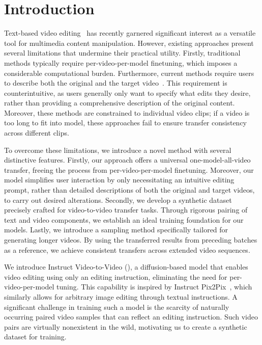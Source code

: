 \section{Introduction}
\label{sec:intro}




Text-based video editing~\cite{tuneavideo,zhao2023controlvideo,vid2vid,qi2023fatezero,liu2023video} has recently garnered significant interest as a versatile tool for multimedia content manipulation. However, existing approaches present several limitations that undermine their practical utility. Firstly, traditional methods typically require per-video-per-model finetuning, which imposes a considerable computational burden. Furthermore, current methods require users to describe both the original and the target video~\cite{tuneavideo,zhao2023controlvideo,vid2vid,qi2023fatezero,liu2023video}. This requirement is counterintuitive, as users generally only want to specify what edits they desire, rather than providing a comprehensive description of the original content. Moreover, these methods are constrained to individual video clips; if a video is too long to fit into model, these approaches fail to ensure transfer consistency across different clips.

To overcome these limitations, we introduce a novel method with several distinctive features. 
Firstly, our approach offers a universal one-model-all-video transfer, freeing the process from per-video-per-model finetuning. Moreover, our model simplifies user interaction by only necessitating an intuitive editing prompt, rather than detailed descriptions of both the original and target videos, to carry out desired alterations. Secondly, we develop a synthetic dataset precisely crafted for video-to-video transfer tasks. Through rigorous pairing of text and video components, we establish an ideal training foundation for our models. Lastly, we introduce a sampling method specifically tailored for generating longer videos. By using the transferred results from preceding batches as a reference, we achieve consistent transfers across extended video sequences. 

We introduce Instruct Video-to-Video (\ours), a diffusion-based model that enables video editing using only an editing instruction, eliminating the need for per-video-per-model tuning. This capability is inspired by Instruct Pix2Pix~\cite{brooks2023instructpix2pix}, which similarly allows for arbitrary image editing through textual instructions. A significant challenge in training such a model is the scarcity of naturally occurring paired video samples that can reflect an editing instruction. Such video pairs are virtually nonexistent in the wild, motivating us to create a synthetic dataset for training.

